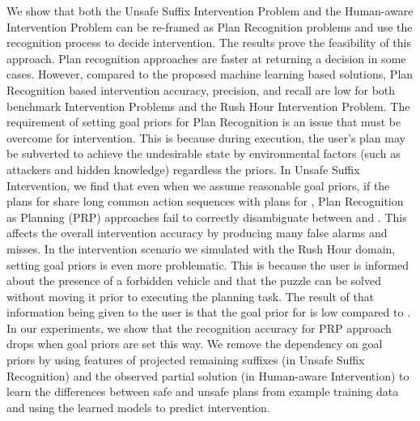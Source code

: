 We show that both the Unsafe Suffix Intervention Problem and the Human-aware Intervention Problem can be re-framed as Plan Recognition problems and use the recognition process to decide intervention. 
The results prove the feasibility of this approach. 
Plan recognition approaches are faster at returning a decision in some cases.
However, compared to the proposed machine learning based solutions, Plan Recognition based intervention accuracy, precision, and recall are low for both benchmark Intervention Problems and the Rush Hour Intervention Problem. 
The requirement of setting goal priors for Plan Recognition is an issue that must be overcome for intervention. 
This is because during execution, the user's plan may be subverted to achieve the undesirable state by environmental factors (such as attackers and hidden knowledge) regardless the priors. 
In Unsafe Suffix Intervention, we find that even when we assume reasonable goal priors, if the plans for \undesired share long common action sequences with plans for \desired, Plan Recognition as Planning (PRP) approaches fail to correctly disambiguate between  \undesired and \desired. 
This affects the overall intervention accuracy by producing many false alarms and misses. 
In the intervention scenario we simulated with the Rush Hour domain, setting goal priors is even more problematic. 
This is because the user is informed about the presence of a forbidden vehicle and that the puzzle can be solved without moving it prior to executing the planning task. 
The result of that information being given to the user is that the goal prior for \undesired is low compared to \desired. 
In our experiments, we show that the recognition accuracy for PRP approach drops when goal priors are set this way. 
We remove the dependency on goal priors by using features of projected remaining suffixes (in Unsafe Suffix Recognition) and the observed partial solution \historyDef (in Human-aware Intervention) to learn the differences between safe and unsafe plans from example training data and using the learned models to predict intervention.

